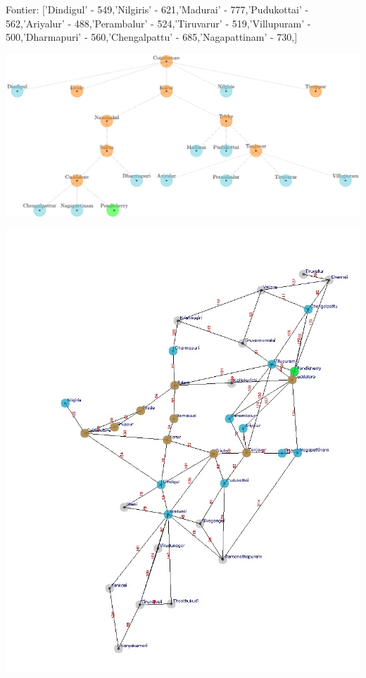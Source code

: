 \documentclass[xcolor=table]{beamer}
\begin{document}
\begin{frame}
  { \tiny Fontier: ['Dindigul' - 549,'Nilgiris' - 621,'Madurai' - 777,'Pudukottai' - 562,'Ariyalur' - 488,'Perambalur' - 524,'Tiruvarur' - 519,'Villupuram' - 500,'Dharmapuri' - 560,'Chengalpattu' - 685,'Nagapattinam' - 730,]}
  \begin{center}
  \includegraphics[height=0.35\textheight]{../AStarNode/12-1.png}
  \end{center}
  \begin{center}
    \includegraphics[height=0.55\textheight]{../AStaroutput/tamilAStar10.jpg}
  \end{center}
\end{frame}
\end{document}
